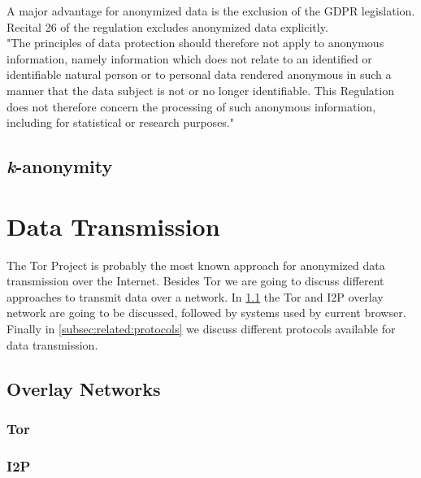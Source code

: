 A major advantage for anonymized data is the exclusion of the GDPR legislation. Recital 26 of the regulation excludes anonymized data explicitly.\\ 
"The principles of data protection should therefore not apply to anonymous information, namely information which does not relate to an identified or identifiable natural person or to personal data rendered anonymous in such a manner that the data subject is not or no longer identifiable. This Regulation does not therefore concern the processing of such anonymous information, including for statistical or research purposes."\cite{european_union_regulation_2016}

%
%
\subsection{\textit{k}-anonymity}
\label{subsec:related:kanon}

\section{Data Transmission}
\label{sec:related:data_transmission}
%
The Tor Project is probably the most known approach for anonymized data transmission over the Internet. Besides Tor we are going to discuss different approaches to transmit data over a network. In \ref{subsec:related:overlay} the Tor and I2P overlay network are going to be discussed, followed by systems used by current browser. Finally in \ref{subsec:related:protocols} we discuss different protocols available for data transmission.


%
%
%
\subsection{Overlay Networks}
\label{subsec:related:overlay}
%
\subsubsection{Tor}

\subsubsection{I2P}

